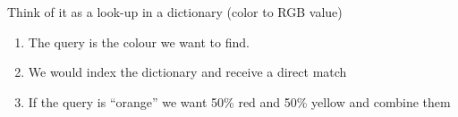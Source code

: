 \documentclass[11pt]{article}
\begin{document}
\begin{minipage}[l]{.6\linewidth}
    \begin{figure}[H]
        \centering
    \end{figure}
\end{minipage}\hfill
\begin{minipage}[r]{.4\linewidth}
    Think of it as a look-up in a dictionary (color to RGB value)
    \begin{enumerate}
        \item The query is the colour we want to find. 
        \item We would index the dictionary and receive a direct match
        \item If the query is ``orange'' we want 50\% red and 50\% yellow and combine them
    \end{enumerate}
\end{minipage}
\end{document}
